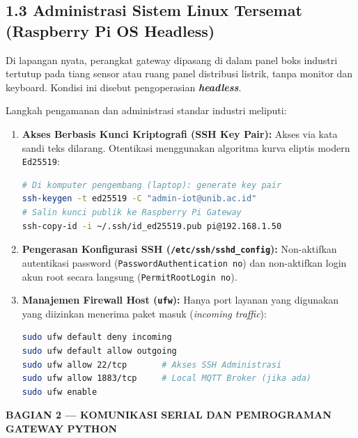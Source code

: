 \documentclass[11pt,a4paper]{article}
\newcommand{\secbanner}[2]{%
    \vspace{8pt}%
    \noindent\colorbox{unibnavy}{%
        \parbox{\dimexpr\textwidth-2\fboxsep\relax}{%
            \vspace{4pt}\textbf{\large\color{white}#1 --- #2}\vspace{4pt}%
        }%
    }%
    \vspace{4pt}%
}
\begin{document}
\subsection*{1.3 Administrasi Sistem Linux Tersemat (Raspberry Pi OS Headless)}
Di lapangan nyata, perangkat gateway dipasang di dalam panel boks industri tertutup pada tiang sensor atau ruang panel distribusi listrik, tanpa monitor dan keyboard. Kondisi ini disebut pengoperasian \textbf{\textit{headless}}.

Langkah pengamanan dan administrasi standar industri meliputi:
\begin{enumerate}
    \item \textbf{Akses Berbasis Kunci Kriptografi (SSH Key Pair):} Akses via kata sandi teks dilarang. Otentikasi menggunakan algoritma kurva eliptis modern \texttt{Ed25519}:
    \begin{lstlisting}[style=iotcode, language=bash]
# Di komputer pengembang (laptop): generate key pair
ssh-keygen -t ed25519 -C "admin-iot@unib.ac.id"
# Salin kunci publik ke Raspberry Pi Gateway
ssh-copy-id -i ~/.ssh/id_ed25519.pub pi@192.168.1.50
    \end{lstlisting}
    \item \textbf{Pengerasan Konfigurasi SSH (\texttt{/etc/ssh/sshd\_config}):} Non-aktifkan autentikasi password (\texttt{PasswordAuthentication no}) dan non-aktifkan login akun root secara langsung (\texttt{PermitRootLogin no}).
    \item \textbf{Manajemen Firewall Host (\texttt{ufw}):} Hanya port layanan yang digunakan yang diizinkan menerima paket masuk (\textit{incoming traffic}):
    \begin{lstlisting}[style=iotcode, language=bash]
sudo ufw default deny incoming
sudo ufw default allow outgoing
sudo ufw allow 22/tcp       # Akses SSH Administrasi
sudo ufw allow 1883/tcp     # Local MQTT Broker (jika ada)
sudo ufw enable
    \end{lstlisting}
\end{enumerate}

\secbanner{BAGIAN 2}{KOMUNIKASI SERIAL DAN PEMROGRAMAN GATEWAY PYTHON}
\end{document}
